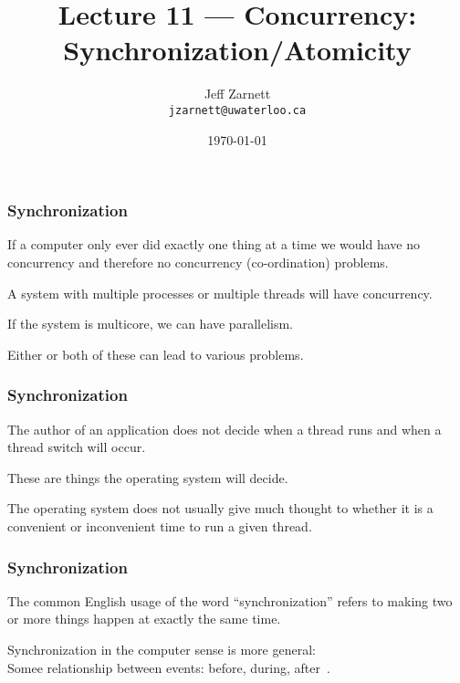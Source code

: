 

\title{Lecture 11 --- Concurrency: Synchronization/Atomicity }

\author{Jeff Zarnett \\ \small \texttt{jzarnett@uwaterloo.ca}}
\date{\today}




\begin{frame}
  \titlepage

 \end{frame}


\begin{frame}
\frametitle{Synchronization}

If a computer only ever did exactly one thing at a time we would have no concurrency and therefore no concurrency (co-ordination) problems. 

A system with multiple processes or multiple threads will have concurrency.

If the system is multicore, we can have parallelism.

Either or both of these can lead to various problems.


\end{frame}

\begin{frame}
\frametitle{Synchronization}

The author of an application does not decide when a thread runs and when a thread switch will occur. 

These are things the operating system will decide. 

The operating system does not usually give much thought to whether it is a convenient or inconvenient time to run a given thread.


\end{frame}

\begin{frame}
\frametitle{Synchronization}

The common English usage of the word ``synchronization'' refers to making two or more things happen at exactly the same time. 

Synchronization in the computer sense is more general:\\
\quad Somee relationship between events: before, during, after~\cite{lbs}. 

\end{frame}


